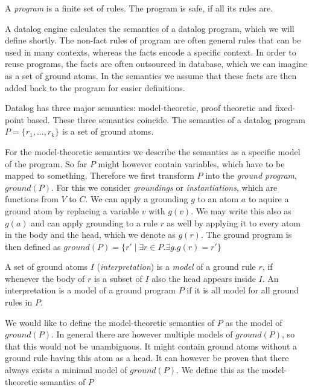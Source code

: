 \documentclass{article}
\begin{document}
        A \textit{program} is a finite set of rules. The program is safe, if all its rules are.

        A datalog engine calculates the semantics of a datalog program, which we will define shortly. The non-fact rules of program are often general rules that can be used in many contexts, whereas the facts encode a specific context. In order to reuse programs, the facts are often outsourced in database, which we can imagine as a set of ground atoms. In the semantics we assume that these facts are then added back to the program for easier definitions.

        Datalog has three major semantics: model-theoretic, proof theoretic and fixed-point based. These three semantics coincide. The semantics of a datalog program $P = \{r_1,...,r_k\}$ is a set of ground atoms.

        For the model-theoretic semantics we describe the semantics as a specific model of the program. So far $P$ might however contain variables, which have to be mapped to something. Therefore we first transform $P$ into the \textit{ground program}, $ground(P)$. For this we consider \textit{groundings} or \textit{instantiations}, which are functions from $V$ to $C$. We can apply a grounding $g$ to an atom $a$ to aquire a ground atom by replacing a variable $v$ with $g(v)$. We may write this also as $g(a)$ and can apply grounding to a rule $r$ as well by applying it to every atom in the body and the head, which we denote as $g(r)$. The ground program is then defined as $ground(P) = \{r' \mid \exists r \in P. \exists g. g(r) = r' \}$

        A set of ground atoms $I$ (\textit{interpretation}) is a \textit{model} of a ground rule $r$, if whenever the body of $r$ is a subset of $I$ also the head appears inside $I$. An interpretation is a model of a ground program $P$ if it is all model for all ground rules in $P$.

        We would like to define the model-theoretic semantics of $P$ as the model of $ground(P)$. In general there are however multiple models of $ground(P)$, so that this would not be unambiguous. It might contain ground atoms without a ground rule having this atom as a head. It can however be proven that there always exists a minimal model of $ground(P)$. We define this as the model-theoretic semantics of $P$
\end{document}

